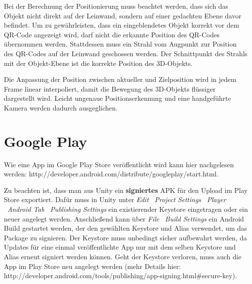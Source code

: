 Bei der Berechnung der Positionierung muss beachtet werden, dass sich das Objekt nicht direkt auf der Leinwand, sondern auf einer gedachten Ebene davor befindet. Um zu gewährleisten, dass ein eingeblendetes Objekt korrekt vor dem QR-Code angezeigt wird, darf nicht die erkannte Position des QR-Codes übernommen werden. Stattdessen muss ein Strahl vom Augpunkt zur Position des QR-Codes auf der Leinwand geschossen werden. Der Schnittpunkt des Strahls mit der Objekt-Ebene ist die korrekte Position des 3D-Objekts.

Die Anpassung der Position zwischen aktueller und Zielposition wird in jedem Frame linear interpoliert, damit die Bewegung des 3D-Objekts flüssiger dargestellt wird. Leicht ungenaue Positionserkennung und eine handgeführte Kamera werden dadurch ausgeglichen.


\section{Google Play}
Wie eine App im Google Play Store veröffentlicht wird kann hier nachgelesen werden: http://developer.android.com/distribute/googleplay/start.html.

Zu beachten ist, dass man aus Unity ein \textbf{signiertes} APK für den Upload im Play Store exportiert. Dafür muss in Unity unter \emph{Edit \textrightarrow\ Project Settings \textrightarrow\ Player \textrightarrow\ Android Tab \textrightarrow\ Publishing Settings} ein existierender Keystore eingetragen oder ein neuer angelegt werden. Anschließend kann über \emph{File \textrightarrow\ Build Settings} ein Android Build gestartet werden, der den gewählten Keystore und Alias verwendet, um das Package zu signieren. Der Keystore muss unbedingt sicher aufbewahrt werden, da Updates für eine einmal veröffentlichte App nur mit dem selben Keystore und Alias erneut signiert werden können. Geht der Keystore verloren, muss auch die App im Play Store neu angelegt werden (mehr Details hier: http://developer.android.com/tools/publishing/app-signing.html\#secure-key).
